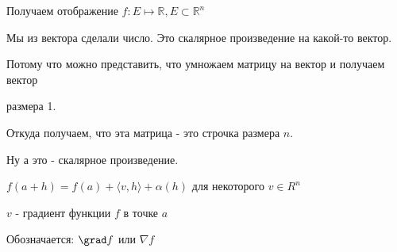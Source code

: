 \begin{example}[Важный частный случай $m = 1$] \thmslashn
    
    Получаем отображение $f: E \mapsto \mathbb{R}, E \subset \mathbb{R}^n$

    Мы из вектора сделали число. Это скалярное произведение на какой-то вектор.

    Потому что можно представить, что умножаем матрицу на вектор и получаем вектор

    размера 1.

    Откуда получаем, что эта матрица - это строчка размера $n$.

    Ну а это - скалярное произведение.

    $f(a + h) = f(a) + \langle v, h \rangle + \alpha(h)$ для некоторого $v \in R^n$

\end{example}

\begin{definition} \thmslashn

$v$ - градиент функции $f$ в точке $a$

Обозначается: $\grad f$ или $\nabla f$ 

\end{definition}
